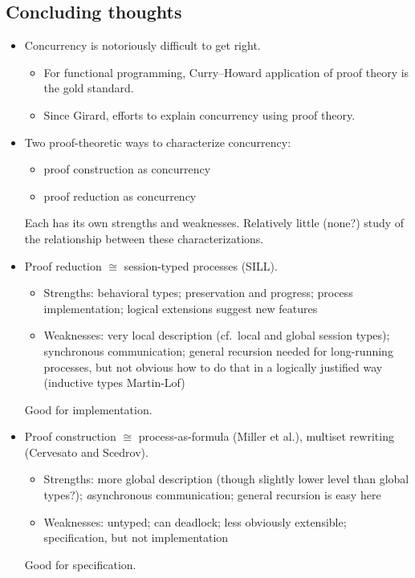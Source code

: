 \subsection{Concluding thoughts}



\begin{itemize}
\item
  Concurrency is notoriously difficult to get right.
  \begin{itemize}[nosep]
  \item For functional programming, Curry--Howard application of proof theory is the gold standard.
  \item Since Girard, efforts to explain concurrency using proof theory.
  \end{itemize}

\item 
  Two proof-theoretic ways to characterize concurrency:
  \begin{itemize}[nosep]
  \item proof construction as concurrency
  \item proof reduction as concurrency
  \end{itemize}
  Each has its own strengths and weaknesses.
  Relatively little (none?) study of the relationship between these characterizations.

\item
  Proof reduction $\cong$ session-typed processes (SILL).
  \begin{itemize}[nosep]
  \item Strengths: behavioral types; preservation and progress; process implementation;
                   logical extensions suggest new features
  \item Weaknesses: very local description (cf.\ local and global session types);
                    synchronous communication; general recursion needed for long-running
                    processes, but not obvious how to do that in a logically justified way
                    (inductive types Martin-Lof)
  \end{itemize}
  Good for implementation.

\item
  Proof construction $\cong$ process-as-formula (Miller et al.),
                             multiset rewriting (Cervesato and Scedrov).
  \begin{itemize}[nosep]
  \item Strengths: more global description (though slightly lower level than global types?);
                   \emph{a}synchronous communication; general recursion is easy here
  \item Weaknesses: untyped; can deadlock; less obviously extensible;
                    specification, but not implementation
  \end{itemize}
  Good for specification.


\end{itemize}
